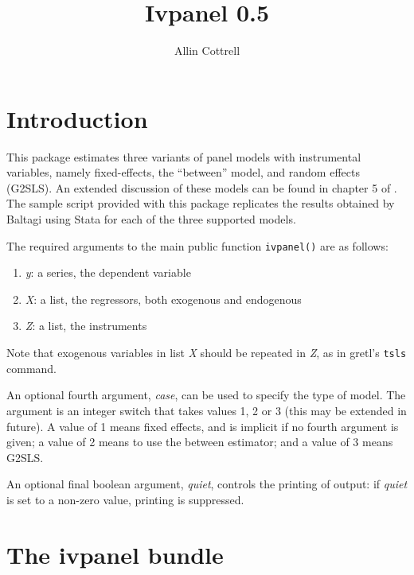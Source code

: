 \documentclass{article}
\begin{document}
\setlength{\parindent}{0pt}
\setlength{\parskip}{1ex}

\newcommand{\argname}[1]{\textsl{#1}}

\title{Ivpanel 0.5}
\author{Allin Cottrell}
\maketitle

\section{Introduction}

This package estimates three variants of panel models with
instrumental variables, namely fixed-effects, the ``between'' model,
and random effects (G2SLS). An extended discussion of these models can
be found in chapter 5 of \cite{baltagi05}. The sample script provided
with this package replicates the results obtained by Baltagi using
\textsf{Stata} for each of the three supported models.

The required arguments to the main public function \texttt{ivpanel()}
are as follows:

\begin{enumerate}
\item \argname{y}: a series, the dependent variable
\item \argname{X}: a list, the regressors, both exogenous and endogenous
\item \argname{Z}: a list, the instruments
\end{enumerate}

Note that exogenous variables in list \argname{X} should be repeated in
\argname{Z}, as in gretl's \texttt{tsls} command.

An optional fourth argument, \argname{case}, can be used to specify the
type of model. The argument is an integer switch that takes values 1,
2 or 3 (this may be extended in future).  A value of 1 means fixed
effects, and is implicit if no fourth argument is given; a value of 2
means to use the between estimator; and a value of 3 means G2SLS.

An optional final boolean argument, \argname{quiet}, controls the
printing of output: if \argname{quiet} is set to a non-zero value,
printing is suppressed.

\section{The ivpanel bundle}
\end{document}
